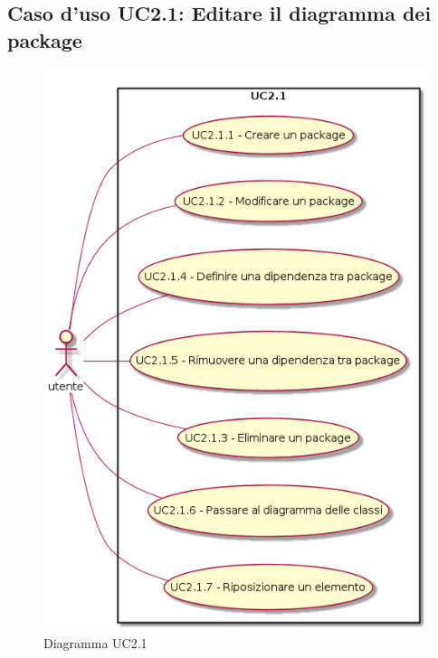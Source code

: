 \documentclass[../AnalisiDeiRequisiti.tex]{subfiles}
\begin{document}
	\subsection{Caso d'uso UC2.1: Editare il diagramma dei package}
	\begin{figure} [H]
		\centering
		\includegraphics[scale=0.45]{./Figures/UC2.1.png}
		\caption{Diagramma UC2.1}\label{}
	\end{figure}
\end{document}
